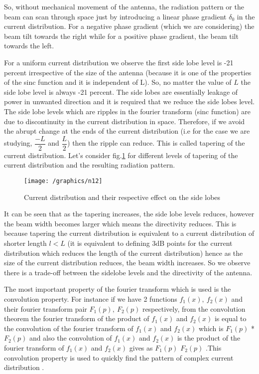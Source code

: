 So, without mechanical movement of the antenna, the radiation pattern or the beam can scan through space just by introducing a linear phase gradient $\delta_0$ in the current distribution. For a negative phase gradient (which we are considering) the beam tilt towards the right while for a positive phase gradient, the beam tilt towards the left.

For a uniform current distribution we observe the first side lobe level is -21 percent irrespective of the size of the antenna (because it is one of the properties of the sinc function and it is independent of L). So, no matter the value of $L$ the side lobe level is always -21 percent. The side lobes are essentially leakage of power in unwanted direction and it is required that we reduce the side lobes level. The side lobe levels which are ripples in the fourier transform (sinc function) are due to discontinuity in the current distribution in space. Therefore, if we avoid the abrupt change at the ends of the current distribution (i.e for the case we are studying, $\dfrac{-L}{2}$ and $\dfrac{L}{2}$) then the ripple can reduce. This is called tapering of the current distribution. Let's consider fig.\ref{fig12} for different levels of tapering of the current distribution and the resulting radiation pattern.
\begin{figure}[h]
\centering
\texttt{[image: /graphics/n12]}
\caption{Current distribution and their respective effect on the side lobes}
\label{fig12}
\end{figure}

It can be seen that as the tapering increases, the side lobe levels reduces, however the beam width becomes larger which means the directivity reduces. This is because tapering the current distribution is equivalent to a current distribution of shorter length $l < L$ (it is equivalent to defining 3dB points for the current distribution which reduces the length of the current distribution) hence as the size of the current distribution reduces, the beam width increases. So we observe there is a trade-off between the sidelobe levels and the directivity of the antenna.


The most important property of the fourier transform which is used is the convolution property. For instance if we have 2 functions $f_{1}(x),\ f_2(x)$ and
their fourier transform pair $F_1(p),\ F_2(p)$ respectively, from the convolution theorem the fourier transform of the product of $f_{1}(x)$ and $f_{2}(x)$ is equal to the convolution of the fourier transform of $f_1(x)$ and $f_2(x)$ which is $F_{1}(p)$ * $F_{2}(p)$ and also the convolution of $f_{1}(x)$ and $f_{2}(x)$ is the product of the fourier transform of $f_{1}(x)$ and $f_{2}(x)$ gives as $F_{1}(p)$ $F_{2}(p)$ .This convolution property is used to quickly find the pattern of complex current distribution .


